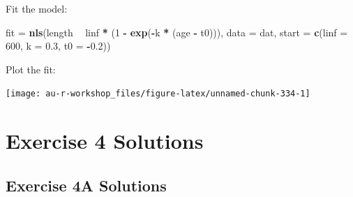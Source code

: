 \documentclass[]{book}
\newenvironment{Shaded}{\begin{snugshade}}{\end{snugshade}}
\newcommand{\KeywordTok}[1]{\textcolor[rgb]{0.13,0.29,0.53}{\textbf{#1}}}
\newcommand{\DataTypeTok}[1]{\textcolor[rgb]{0.13,0.29,0.53}{#1}}
\newcommand{\DecValTok}[1]{\textcolor[rgb]{0.00,0.00,0.81}{#1}}
\newcommand{\FloatTok}[1]{\textcolor[rgb]{0.00,0.00,0.81}{#1}}
\newcommand{\StringTok}[1]{\textcolor[rgb]{0.31,0.60,0.02}{#1}}
\newcommand{\OperatorTok}[1]{\textcolor[rgb]{0.81,0.36,0.00}{\textbf{#1}}}
\newcommand{\NormalTok}[1]{#1}
\theoremstyle{definition}
\theoremstyle{definition}
\theoremstyle{definition}
\theoremstyle{remark}
\begin{document}
Fit the model:

\begin{Shaded}
\begin{Highlighting}[]
\NormalTok{fit =}\StringTok{ }\KeywordTok{nls}\NormalTok{(length }\OperatorTok{~}\StringTok{ }\NormalTok{linf }\OperatorTok{*}\StringTok{ }\NormalTok{(}\DecValTok{1} \OperatorTok{-}\StringTok{ }\KeywordTok{exp}\NormalTok{(}\OperatorTok{-}\NormalTok{k }\OperatorTok{*}\StringTok{ }\NormalTok{(age }\OperatorTok{-}\StringTok{ }\NormalTok{t0))),}
          \DataTypeTok{data =}\NormalTok{ dat, }\DataTypeTok{start =} \KeywordTok{c}\NormalTok{(}\DataTypeTok{linf =} \DecValTok{600}\NormalTok{, }\DataTypeTok{k =} \FloatTok{0.3}\NormalTok{, }\DataTypeTok{t0 =} \OperatorTok{-}\FloatTok{0.2}\NormalTok{))}
\end{Highlighting}
\end{Shaded}

Plot the fit:

\begin{Shaded}
\end{Shaded}

\begin{center}\texttt{[image: au-r-workshop\_files/figure-latex/unnamed-chunk-334-1]} \end{center}

\section*{Exercise 4 Solutions}\label{ex4-answers}

\hypertarget{ex4a-answers}{\subsection*{Exercise 4A
Solutions}\label{ex4a-answers}}
\end{document}

